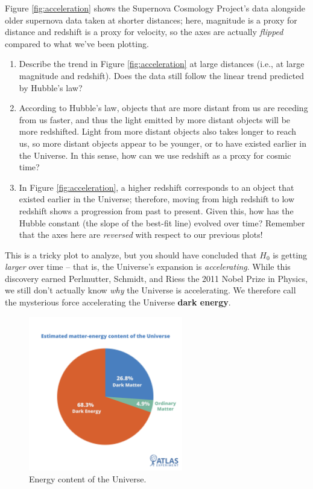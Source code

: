 \documentclass[11pt]{article}
\begin{document}
Figure \ref{fig:acceleration} shows the Supernova Cosmology Project's data alongside older supernova data taken at shorter distances; here, magnitude is a proxy for distance and redshift is a proxy for velocity, so the axes are actually \emph{flipped} compared to what we've been plotting. 
\begin{enumerate}[resume]
    \item Describe the trend in Figure \ref{fig:acceleration} at large distances (i.e., at large magnitude and redshift). Does the data still follow the linear trend predicted by Hubble's law?
    
    \item According to Hubble's law, objects that are more distant from us are receding from us faster, and thus the light emitted by more distant objects will be more redshifted. Light from more distant objects also takes longer to reach us, so more distant objects appear to be younger, or to have existed earlier in the Universe. In this sense, how can we use redshift as a proxy for cosmic time?   
    
    \item In Figure \ref{fig:acceleration}, a higher redshift corresponds to an object that existed earlier in the Universe; therefore, moving from high redshift to low redshift shows a progression from past to present. Given this, how has the Hubble constant (the slope of the best-fit line) evolved over time? Remember that the axes here are \emph{reversed} with respect to our previous plots!
\end{enumerate}

This is a tricky plot to analyze, but you should have concluded that $H_0$ is getting \emph{larger} over time -- that is, the Universe's expansion is \emph{accelerating}. While this discovery earned Perlmutter, Schmidt, and Riess the 2011 Nobel Prize in Physics, we still don't actually know \emph{why} the Universe is accelerating. We therefore call the mysterious force accelerating the Universe \textbf{dark energy}.  

\begin{figure}[h!]
    \centering
    \includegraphics[width=0.6\textwidth]{dark energy.png}
    \caption{Energy content of the Universe.}
    \label{fig:energy}
\end{figure}
\end{document}
